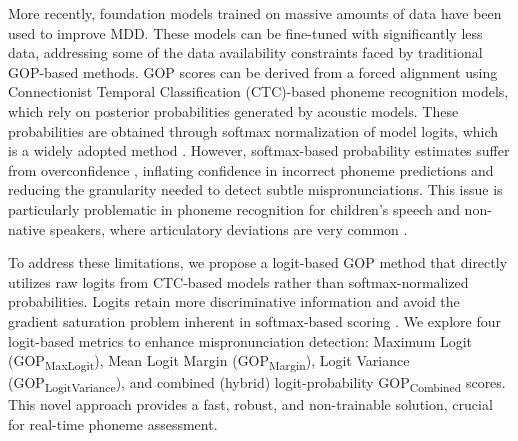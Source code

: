 \documentclass{Interspeech}
\begin{document}
More recently, foundation models \cite{babu2021xls,10.1109/TASLP.2021.3122291} trained on massive amounts of data have been used to improve MDD. These models can be fine-tuned with significantly less data, addressing some of the data availability constraints faced by traditional GOP-based methods. GOP scores can be derived from a forced alignment using Connectionist Temporal Classification (CTC)-based phoneme recognition models, which rely on posterior probabilities generated by acoustic models. These probabilities are obtained through softmax normalization of model logits, which is a widely adopted method \cite{sudhakara2019improved}. However, softmax-based probability estimates suffer from overconfidence \cite{pearce2021understanding,wei2022mitigating}, inflating confidence in incorrect phoneme predictions and reducing the granularity needed to detect subtle mispronunciations. This issue is particularly problematic in phoneme recognition for children's speech and non-native speakers, where articulatory deviations are very common \cite{xie2020comparing,preston2015perception}.

To address these limitations, we propose a logit-based GOP method that directly utilizes raw logits from CTC-based models rather than softmax-normalized probabilities. Logits retain more discriminative information and avoid the gradient saturation problem inherent in softmax-based scoring \cite{li2020learning}. We explore four logit-based metrics to enhance mispronunciation detection: Maximum Logit (GOP\textsubscript{MaxLogit}), Mean Logit Margin \cite{10147340} (GOP\textsubscript{Margin}), Logit Variance (GOP\textsubscript{LogitVariance}), and combined (hybrid) logit-probability GOP\textsubscript{Combined} scores. This novel approach provides a fast, robust, and non-trainable solution, crucial for real-time phoneme assessment.
\end{document}
